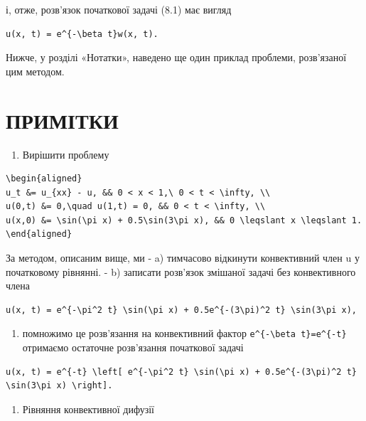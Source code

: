 \documentclass[
  ukrainian,
]{article}
\providecommand{\tightlist}{%
  \setlength{\itemsep}{0pt}\setlength{\parskip}{0pt}}
\begin{document}
і, отже, розв'язок початкової задачі (8.1) має вигляд

\begin{verbatim}
u(x, t) = e^{-\beta t}w(x, t).
\end{verbatim}

Нижче, у розділі «Нотатки», наведено ще один приклад проблеми,
розв'язаної цим методом.

\section{ПРИМІТКИ}\label{ux43fux440ux438ux43cux456ux442ux43aux438}

\begin{enumerate}
\def\labelenumi{\arabic{enumi}.}
\tightlist
\item
  Вирішити проблему
\end{enumerate}

\begin{verbatim}
\begin{aligned}
u_t &= u_{xx} - u, && 0 < x < 1,\ 0 < t < \infty, \\
u(0,t) &= 0,\quad u(1,t) = 0, && 0 < t < \infty, \\
u(x,0) &= \sin(\pi x) + 0.5\sin(3\pi x), && 0 \leqslant x \leqslant 1.
\end{aligned}
\end{verbatim}

За методом, описаним вище, ми - a) тимчасово відкинути конвективний член
u у початковому рівнянні. - b) записати розв'язок змішаної задачі без
конвективного члена

\begin{verbatim}
u(x, t) = e^{-\pi^2 t} \sin(\pi x) + 0.5e^{-(3\pi)^2 t} \sin(3\pi x),
\end{verbatim}

\begin{enumerate}
\def\labelenumi{\alph{enumi})}
\setcounter{enumi}{2}
\tightlist
\item
  помножимо це розв'язання на конвективний фактор
  \texttt{e\^{}\{-\textbackslash{}beta\ t\}=e\^{}\{-t\}} отримаємо
  остаточне розв'язання початкової задачі
\end{enumerate}

\begin{verbatim}
u(x, t) = e^{-t} \left[ e^{-\pi^2 t} \sin(\pi x) + 0.5e^{-(3\pi)^2 t} \sin(3\pi x) \right].
\end{verbatim}

\begin{enumerate}
\def\labelenumi{\arabic{enumi}.}
\setcounter{enumi}{1}
\tightlist
\item
  Рівняння конвективної дифузії
\end{enumerate}
\end{document}
